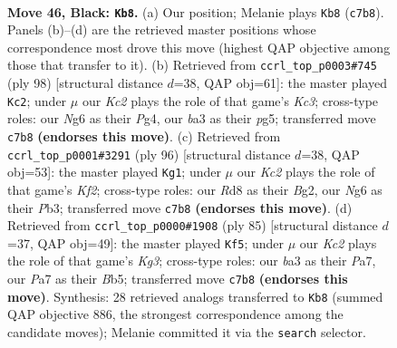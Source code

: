 \documentclass[11pt]{article}
\begin{document}
\clearpage

\begin{figure}[p]\centering
\begin{subfigure}{0.46\textwidth}\centering
\resizebox{\linewidth}{!}{%
\newchessgame
\chessboard[
  setfen={3r4/p1k5/Pp4nb/1B3p2/4pP2/B7/5K2/2R5 b - - 25 46},
  showmover=false,
  pgfstyle=straightmove, color=movearrow, markmove={c7-b8}
]}
\caption{}
\end{subfigure}\hfill
\begin{subfigure}{0.46\textwidth}\centering
\resizebox{\linewidth}{!}{%
\newchessgame
\chessboard[
  setfen={2k5/p7/2N2R2/1Pb3p1/2P1p1P1/2K4r/8/8 w - - 3 50},
  showmover=false,
  pgfstyle=straightmove, color=movearrow, markmove={c3-c2}
]}
\caption{}
\end{subfigure}
\\[4pt]
\begin{subfigure}{0.46\textwidth}\centering
\resizebox{\linewidth}{!}{%
\newchessgame
\chessboard[
  setfen={8/1R3pk1/8/4p2p/4P2P/1P1b1P2/2r2KB1/8 w - - 17 49},
  showmover=false,
  pgfstyle=straightmove, color=movearrow, markmove={f2-g1}
]}
\caption{}
\end{subfigure}\hfill
\begin{subfigure}{0.46\textwidth}\centering
\resizebox{\linewidth}{!}{%
\newchessgame
\chessboard[
  setfen={6R1/p7/1b2p1k1/1b1pB1pp/3P4/1P2K3/8/8 b - - 3 43},
  showmover=false,
  pgfstyle=straightmove, color=movearrow, markmove={g6-f5}
]}
\caption{}
\end{subfigure}
\caption{\textbf{Move 46, Black: \texttt{Kb8}.} (a) Our position; Melanie plays \texttt{Kb8} (\texttt{c7b8}). Panels (b)--(d) are the retrieved master positions whose correspondence most drove this move (highest QAP objective among those that transfer to it). (b) Retrieved from \texttt{ccrl\_top\_p0003\#745} (ply 98) [structural distance $d$=38, QAP obj=61]: the master played \texttt{Kc2}; under $\mu$ our \emph{Kc2} plays the role of that game's \emph{Kc3}; cross-type roles: our \emph{N}g6 as their \emph{P}g4, our \emph{b}a3 as their \emph{p}g5; transferred move \texttt{c7b8} \textbf{(endorses this move)}. (c) Retrieved from \texttt{ccrl\_top\_p0001\#3291} (ply 96) [structural distance $d$=38, QAP obj=53]: the master played \texttt{Kg1}; under $\mu$ our \emph{Kc2} plays the role of that game's \emph{Kf2}; cross-type roles: our \emph{R}d8 as their \emph{B}g2, our \emph{N}g6 as their \emph{P}b3; transferred move \texttt{c7b8} \textbf{(endorses this move)}. (d) Retrieved from \texttt{ccrl\_top\_p0000\#1908} (ply 85) [structural distance $d$=37, QAP obj=49]: the master played \texttt{Kf5}; under $\mu$ our \emph{Kc2} plays the role of that game's \emph{Kg3}; cross-type roles: our \emph{b}a3 as their \emph{P}a7, our \emph{P}a7 as their \emph{B}b5; transferred move \texttt{c7b8} \textbf{(endorses this move)}. Synthesis: 28 retrieved analogs transferred to \texttt{Kb8} (summed QAP objective 886, the strongest correspondence among the candidate moves); Melanie committed it via the \texttt{search} selector.}
\label{fig:thought-m91}
\end{figure}
\end{document}
